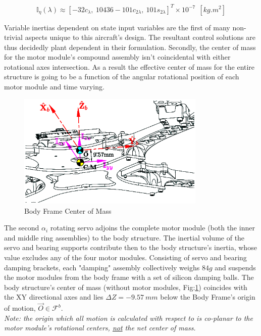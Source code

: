 \begin{equation}\label{eq:inertia.middle.vpa}
\mathbb{I}_\eta(\lambda)\approx[-32{c}_{\lambda},~ 10436-101{c}_{2\lambda},~ 101{s}_{2\lambda}]^T\times10^{-7}~~[kg.m^2]
\end{equation}
\par
Variable inertias dependent on state input variables are the first of many non-trivial aspects unique to this aircraft's design. The resultant control solutions are thus decidedly plant dependent in their formulation. Secondly, the center of mass for the motor module's compound assembly isn't coincidental with either rotational axes intersection. As a result the effective center of mass for the entire structure is going to be a function of the angular rotational position of each motor module and time varying.
\par
\begin{figure}[htbp]
\centering
\includegraphics[width=0.8\textwidth]{figs/inertia-center}
\caption{Body Frame Center of Mass}
\label{fig:inertia-center}
\end{figure}
The second $\alpha_i$ rotating servo adjoins the complete motor module (both the inner and middle ring assemblies) to the body structure. The inertial volume of the servo and bearing supports contribute then to the body structure's inertia, whose value excludes any of the four motor modules. Consisting of servo and bearing damping brackets, each "damping" assembly collectively weighs $84g$ and suspends the motor modules from the body frame with a set of silicon damping balls. The body structure's center of mass (without motor modules, Fig:\ref{fig:inertia-center}) coincides with the XY directional axes and lies $\Delta Z=-9.57~mm$ below the Body Frame's origin of motion, $\vec{O}\in\mathcal{F}^b$.
\\
\emph{\color{Gray}Note: the origin which all motion is calculated with respect to is co-planar to the motor module's rotational centers, \underline{not} the net center of mass.}
